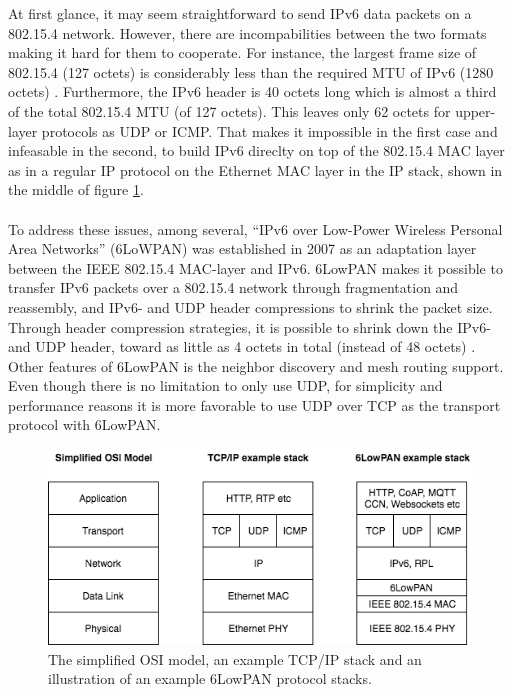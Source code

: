 At first glance, it may seem straightforward to send IPv6 data packets on a 802.15.4 network. However, there are incompabilities between the two formats making it hard for them to cooperate. For instance, the largest frame size of 802.15.4 (127 octets) is considerably less than the required MTU of IPv6 (1280 octets) \cite{rfc4944}. Furthermore, the IPv6 header is 40 octets long which is almost a third of the total 802.15.4 MTU (of 127 octets). This leaves only 62 octets for upper-layer protocols as UDP or ICMP. That makes it impossible in the first case and infeasable in the second, to build IPv6 direclty on top of the 802.15.4 MAC layer as in a regular IP protocol on the Ethernet MAC layer in the IP stack, shown in the middle of figure \ref{fig:ip-6lowpan-stack}.\\\\
To address these issues, among several, ``IPv6 over Low-Power Wireless Personal Area Networks'' (6LoWPAN) was established in 2007 as an adaptation layer between the IEEE 802.15.4 MAC-layer and IPv6. 6LowPAN makes it possible to transfer IPv6 packets over a 802.15.4 network through fragmentation and reassembly, and IPv6- and UDP header compressions to shrink the packet size. Through header compression strategies, it is possible to shrink down the IPv6- and UDP header, toward as little as 4 octets in total (instead of 48 octets) \cite{rfc4944}. Other features of 6LowPAN is the neighbor discovery and mesh routing support. Even though there is no limitation to only use UDP, for simplicity and performance reasons it is more favorable to use UDP over TCP as the transport protocol with 6LowPAN.


\begin{figure}
	\includegraphics[width=\textwidth]{figures/6lowpan-own.png}
	\caption{The simplified OSI model, an example TCP/IP stack and an illustration of an example 6LowPAN protocol stacks.}
	\label{fig:ip-6lowpan-stack}
\end{figure}

